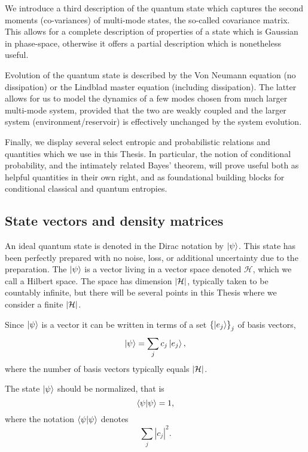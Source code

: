 We introduce a third description of the quantum state which captures the second moments (co-variances) of multi-mode states, the so-called covariance matrix. This allows for a complete description of properties of a state which is Gaussian in phase-space, otherwise it offers a partial description which is nonetheless useful. 

Evolution of the quantum state is described by the Von Neumann equation (no dissipation) or the Lindblad master equation (including dissipation). The latter allows for us to model the dynamics of a few modes chosen from much larger multi-mode system, provided that the two are weakly coupled and the larger system (environment/reservoir) is effectively unchanged by the system evolution. 

Finally, we display several select entropic and probabilistic relations and quantities which we use in this Thesis. In particular, the notion of conditional probability, and the intimately related Bayes' theorem, will prove useful both as helpful quantities in their own right, and as foundational building blocks for conditional classical and quantum entropies. 





\FloatBarrier
\subsection{State vectors and density matrices}\label{sec:intro_state_vectors}
An ideal quantum state is denoted in the Dirac notation by $\ket{\psi}$. This state has been perfectly prepared with no noise, loss, or additional uncertainty due to the preparation. The $\ket{\psi}$ is a vector living in a vector space denoted $\mathcal{H}$, which we call a Hilbert space. The space has dimension $\left|\mathcal{H}\right|$, typically taken to be countably infinite, but there will be several points in this Thesis where we consider a finite $\left|\mathcal{H}\right|$.

Since $\ket{\psi}$ is a vector it can be written in terms of a set $\left\{\ket{e_j}\right\}_j$ of basis vectors,
\begin{equation}
\ket{\psi} = \sum_j c_j \ket{e_j},
\end{equation}
where the number of basis vectors typically equals $\left|\mathcal{H}\right|$. 

The state $\ket{\psi}$ should be normalized, that is
\begin{equation}
\ip{\psi} = 1,
\end{equation}
where the notation $\ip{\psi}$ denotes 
\begin{equation}
\sum_j \left|c_j\right|^2.
\end{equation}

